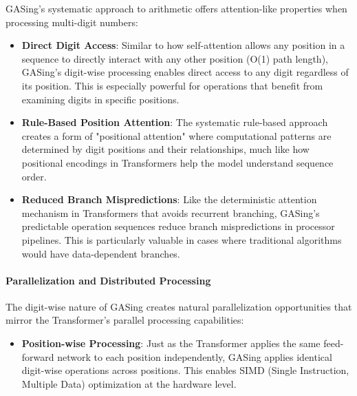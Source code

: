 GASing's systematic approach to arithmetic offers attention-like properties when processing multi-digit numbers:

\begin{itemize}
\item \textbf{Direct Digit Access}: Similar to how self-attention allows any position in a sequence to directly interact with any other position (O(1) path length), GASing's digit-wise processing enables direct access to any digit regardless of its position. This is especially powerful for operations that benefit from examining digits in specific positions.
\end{itemize}

\begin{itemize}
\item \textbf{Rule-Based Position Attention}: The systematic rule-based approach creates a form of "positional attention" where computational patterns are determined by digit positions and their relationships, much like how positional encodings in Transformers help the model understand sequence order.
\end{itemize}

\begin{itemize}
\item \textbf{Reduced Branch Mispredictions}: Like the deterministic attention mechanism in Transformers that avoids recurrent branching, GASing's predictable operation sequences reduce branch mispredictions in processor pipelines. This is particularly valuable in cases where traditional algorithms would have data-dependent branches.
\end{itemize}
\paragraph{Parallelization and Distributed Processing}

The digit-wise nature of GASing creates natural parallelization opportunities that mirror the Transformer's parallel processing capabilities:

\begin{itemize}
\item \textbf{Position-wise Processing}: Just as the Transformer applies the same feed-forward network to each position independently, GASing applies identical digit-wise operations across positions. This enables SIMD (Single Instruction, Multiple Data) optimization at the hardware level.
\end{itemize}

